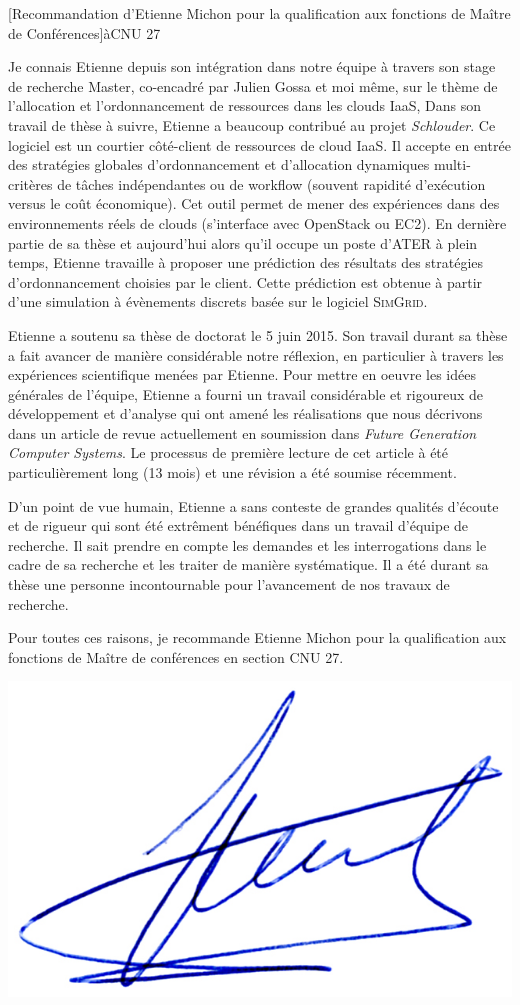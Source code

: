 \documentclass[a4paper,10pt]{article}
\begin{document}


\begin{letter}[Recommandation d'Etienne Michon pour la qualification aux
  fonctions de Maître de Conférences]{à}{CNU 27}

  Je connais  Etienne depuis  son intégration  dans notre  équipe à  travers son
  stage de  recherche Master, co-encadré  par Julien Gossa  et moi même,  sur le
  thème de l'allocation et l'ordonnancement  de ressources dans les clouds IaaS,
  Dans son  travail de thèse  à suivre, Etienne  a beaucoup contribué  au projet
  \emph{Schlouder}. Ce  logiciel est  un courtier  côté-client de  ressources de
  cloud IaaS.  Il accepte en  entrée des stratégies globales d'ordonnancement et
  d'allocation dynamiques multi-critères de  tâches indépendantes ou de workflow
  (souvent rapidité d'exécution versus le coût économique).  Cet outil permet de
  mener des  expériences dans  des environnements  réels de  clouds (s'interface
  avec OpenStack ou  EC2).  En dernière partie de sa  thèse et aujourd'hui alors
  qu'il occupe un  poste d'ATER à plein temps, Etienne  travaille à proposer une
  prédiction  des  résultats des  stratégies  d'ordonnancement  choisies par  le
  client.  Cette prédiction  est obtenue à partir d'une  simulation à évènements
  discrets basée sur le logiciel \textsc{SimGrid}.

  Etienne a soutenu sa thèse de doctorat  le 5 juin 2015.  Son travail durant sa
  thèse a fait avancer de manière considérable notre réflexion, en particulier à
  travers les expériences scientifique menées par Etienne. Pour mettre en oeuvre
  les idées générales  de l'équipe, Etienne a fourni un  travail considérable et
  rigoureux de  développement et  d'analyse qui ont  amené les  réalisations que
  nous  décrivons dans  un  article  de revue  actuellement  en soumission  dans
  \textit{Future Generation Computer Systems}.  Le processus de première lecture
  de cet  article à été  particulièrement long (13 mois)  et une révision  a été
  soumise récemment.

  D'un point de vue humain, Etienne a sans conteste de grandes qualités d'écoute
  et de  rigueur qui sont été  extrêment bénéfiques dans un  travail d'équipe de
  recherche. Il sait  prendre en compte les demandes et  les interrogations dans
  le cadre  de sa  recherche et les  traiter de manière  systématique. Il  a été
  durant sa thèse  une personne incontournable pour l'avancement  de nos travaux
  de recherche.

  Pour toutes ces raisons, je recommande  Etienne Michon pour la qualification
  aux fonctions de Maître de conférences en section CNU 27.

\end{letter}
\begin{flushright}
\includegraphics[width=.20\textwidth]{signgenaud.jpg}
\end{flushright}
\end{document}
